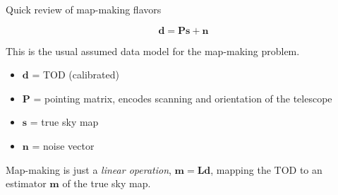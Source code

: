 \documentclass[final]{beamer}
\newlength{\colwidth}
\begin{document}
\begin{frame}[t]
\begin{columns}[t]
\begin{column}{\colwidth}
\begin{alertblock}{Quick review of map-making flavors}

        \begin{equation}\label{eq:data_model}
          \mathbf d = \mathbf{P s} + \mathbf n
        \end{equation}

        This is the usual assumed data model for the map-making problem.

        \begin{itemize}
          \item $\mathbf d$ = TOD (calibrated)
          \item $\mathbf P$ = pointing matrix, encodes scanning and orientation of the telescope
          \item $\mathbf s$ = true sky map
          \item $\mathbf n$ = noise vector
        \end{itemize}

        Map-making is just a \emph{linear operation}, \( \mathbf m = \mathbf{L d} \), mapping the TOD to an estimator $\mathbf m$ of the true sky map.


\end{alertblock}
\end{column}
\end{columns}
\end{frame}
\end{document}
